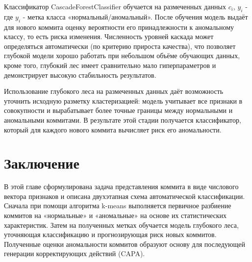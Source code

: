 Классификатор CascadeForestClassifier обучается на размеченных данных {\( c_i \), \( y_i \)} - где \( y_i \) - метка класса «нормальный/аномальный». После обучения модель выдаёт для нового коммита оценку вероятности его принадлежности к аномальному классу, то есть риска изменения. Численность уровней каскада может определяться автоматически (по критерию прироста качества), что позволяет глубокой модели хорошо работать при небольшом объёме обучающих данных, кроме того, глубокий лес имеет сравнительно мало гиперпараметров и демонстрирует высокую стабильность результатов.

Использование глубокого леса на размеченных данных даёт возможность уточнить исходную разметку кластеризацией: модель учитывает все признаки в совокупности и вырабатывает более точные границы между нормальными и аномальными коммитами. В результате этой стадии получается классификатор, который для каждого нового коммита вычисляет риск его аномальности.


\section{Заключение} \label{ch2:conclusion}

В этой главе сформулирована задача представления коммита в виде числового вектора признаков и описана двухэтапная схема автоматической классификации. Сначала при помощи алгоритма k-means выполняется первичное разбиение коммитов на «нормальные» и «аномальные» на основе их статистических характеристик. Затем на полученных метках обучается модель глубокого леса, уточняющая классификацию и прогнозирующая риск новых коммитов. Полученные оценки аномальности коммитов образуют основу для последующей генерации корректирующих действий (CAPA).
